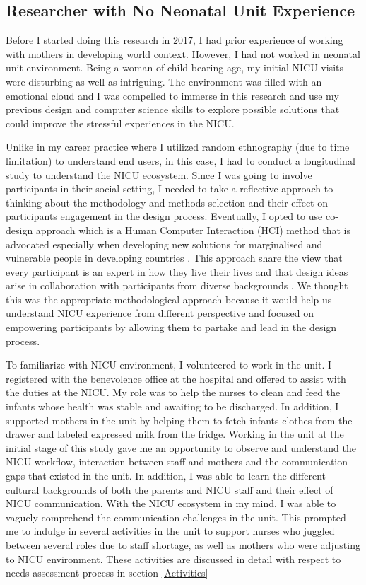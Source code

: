 \subsection{Researcher with No Neonatal Unit Experience}
Before I started doing this research in 2017, I had prior experience of working with mothers in developing world context. However, I had not worked in neonatal unit environment. Being a woman of child bearing age, my initial NICU visits were disturbing as well as intriguing. The environment was filled with an emotional cloud and I was compelled to immerse in this research and use my previous design and computer science skills to explore possible solutions that could improve the stressful experiences in the NICU. 

Unlike in my career practice where I utilized random ethnography (due to time limitation) to understand end users, in this case, I had to conduct a longitudinal study to understand the NICU ecosystem. Since I was going to involve participants in their social setting, I needed to take a reflective approach to thinking about the methodology and methods selection and their effect on participants engagement in the design process. Eventually, I opted to use co-design approach which is a Human Computer Interaction (HCI) method that is advocated especially when developing new solutions for marginalised and vulnerable people in developing countries \cite {Sharma2008}. This approach share the view that every participant is an expert in how they live their lives and that design ideas arise in collaboration with participants from diverse backgrounds \citep{Sanoff2016}. We thought this was the appropriate methodological approach because it would help us understand NICU experience from different perspective and  focused on empowering participants by allowing them to partake and lead in the design process.

To familiarize with NICU environment, I volunteered to work in the unit. I registered with the benevolence office at the hospital and offered to assist with the duties at the NICU.  My role was to help the nurses to clean and feed the infants whose health was stable and awaiting to be discharged. In addition, I supported mothers in the unit by helping them to fetch infants clothes from the drawer and labeled expressed milk from the fridge. Working in the unit at the initial stage of this study gave me an opportunity to observe and understand the NICU workflow, interaction between staff and mothers and the communication gaps that existed in the unit. In addition, I was able to learn the different cultural backgrounds of both the parents and NICU staff and their effect of NICU communication. With the NICU ecosystem in my mind, I was able to vaguely comprehend the communication challenges in the unit. This prompted me to indulge in several activities in the unit to support nurses who juggled between several roles due to staff shortage, as well as mothers who were adjusting to NICU environment. These activities are discussed in detail with respect to needs assessment process in section \ref{Activities}

